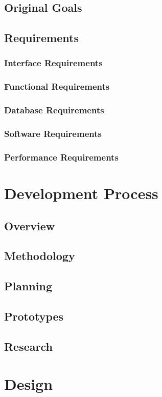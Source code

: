 \documentclass[11pt]{article}
\begin{document}
	\subsection{Original Goals}
	\subsection{Requirements}
		\subsubsection{Interface Requirements}
		\subsubsection{Functional Requirements}
		\subsubsection{Database Requirements}
		\subsubsection{Software Requirements}
		\subsubsection{Performance Requirements}
		
\section{Development Process}
	\subsection{Overview}
	\subsection{Methodology}
	\subsection{Planning}
	\subsection{Prototypes}
	\subsection{Research}

\section{Design}
\end{document}
